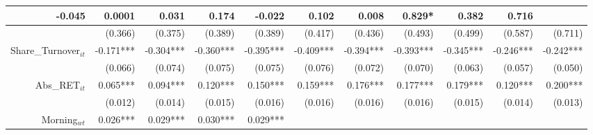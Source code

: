 \begin{table}
{\begin{tabular}{rrrrrrrrrrr}
  \multicolumn{1}{r|}{-0.045} &
  \multicolumn{1}{r|}{0.0001} &
  \multicolumn{1}{r|}{0.031} &
  \multicolumn{1}{r|}{0.174} &
  \multicolumn{1}{r|}{-0.022} &
  \multicolumn{1}{r|}{0.102} &
  \multicolumn{1}{r|}{0.008} &
  \multicolumn{1}{r|}{0.829*} &
  \multicolumn{1}{r|}{0.382} &
  \multicolumn{1}{r|}{0.716} \\ \hline
\multicolumn{1}{|r|}{} &
  \multicolumn{1}{r|}{(0.366)} &
  \multicolumn{1}{r|}{(0.375)} &
  \multicolumn{1}{r|}{(0.389)} &
  \multicolumn{1}{r|}{(0.389)} &
  \multicolumn{1}{r|}{(0.417)} &
  \multicolumn{1}{r|}{(0.436)} &
  \multicolumn{1}{r|}{(0.493)} &
  \multicolumn{1}{r|}{(0.499)} &
  \multicolumn{1}{r|}{(0.587)} &
  \multicolumn{1}{r|}{(0.711)} \\ \hline
\multicolumn{1}{|r|}{Share\_Turnover$_{it}$} &
  \multicolumn{1}{r|}{-0.171***} &
  \multicolumn{1}{r|}{-0.304***} &
  \multicolumn{1}{r|}{-0.360***} &
  \multicolumn{1}{r|}{-0.395***} &
  \multicolumn{1}{r|}{-0.409***} &
  \multicolumn{1}{r|}{-0.394***} &
  \multicolumn{1}{r|}{-0.393***} &
  \multicolumn{1}{r|}{-0.345***} &
  \multicolumn{1}{r|}{-0.246***} &
  \multicolumn{1}{r|}{-0.242***} \\ \hline
\multicolumn{1}{|r|}{} &
  \multicolumn{1}{r|}{(0.066)} &
  \multicolumn{1}{r|}{(0.074)} &
  \multicolumn{1}{r|}{(0.075)} &
  \multicolumn{1}{r|}{(0.075)} &
  \multicolumn{1}{r|}{(0.076)} &
  \multicolumn{1}{r|}{(0.072)} &
  \multicolumn{1}{r|}{(0.070)} &
  \multicolumn{1}{r|}{(0.063)} &
  \multicolumn{1}{r|}{(0.057)} &
  \multicolumn{1}{r|}{(0.050)} \\ \hline
\multicolumn{1}{|r|}{Abs\_RET$_{it}$} &
  \multicolumn{1}{r|}{0.065***} &
  \multicolumn{1}{r|}{0.094***} &
  \multicolumn{1}{r|}{0.120***} &
  \multicolumn{1}{r|}{0.150***} &
  \multicolumn{1}{r|}{0.159***} &
  \multicolumn{1}{r|}{0.176***} &
  \multicolumn{1}{r|}{0.177***} &
  \multicolumn{1}{r|}{0.179***} &
  \multicolumn{1}{r|}{0.120***} &
  \multicolumn{1}{r|}{0.200***} \\ \hline
\multicolumn{1}{|r|}{} &
  \multicolumn{1}{r|}{(0.012)} &
  \multicolumn{1}{r|}{(0.014)} &
  \multicolumn{1}{r|}{(0.015)} &
  \multicolumn{1}{r|}{(0.016)} &
  \multicolumn{1}{r|}{(0.016)} &
  \multicolumn{1}{r|}{(0.016)} &
  \multicolumn{1}{r|}{(0.016)} &
  \multicolumn{1}{r|}{(0.015)} &
  \multicolumn{1}{r|}{(0.014)} &
  \multicolumn{1}{r|}{(0.013)} \\ \hline
\multicolumn{1}{|r|}{Morning$_{wt}$} &
  \multicolumn{1}{r|}{0.026***} &
  \multicolumn{1}{r|}{0.029***} &
  \multicolumn{1}{r|}{0.030***} &
  \multicolumn{1}{r|}{0.029***} &

\end{tabular}}
\end{table}
